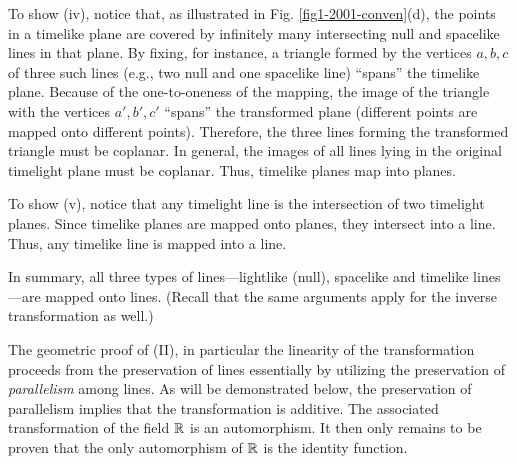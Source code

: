 To show (iv), notice that, as illustrated in Fig. \ref{fig1-2001-conven}(d),
the points in a timelike plane are covered by infinitely many intersecting null and spacelike
lines in that plane.
By fixing, for instance, a triangle formed by the vertices $a,b,c$
of three such lines
(e.g., two null and one spacelike line) ``spans'' the timelike plane.
Because of the one-to-oneness of the mapping,
the image of the triangle with the vertices $a',b',c'$
``spans'' the transformed plane (different points are mapped onto different points).
Therefore, the three lines  forming the transformed
triangle must be coplanar.
In general, the images of all lines lying in the original timelight plane must be coplanar.
Thus, timelike planes map into planes.

To show (v), notice that any timelight line is the intersection of two timelight planes.
Since timelike planes are mapped onto planes, they intersect into a line.
Thus, any timelike line is mapped into a line.

In summary, all three types of lines---lightlike (null), spacelike
and timelike lines---are mapped onto lines.
(Recall that the same arguments apply for the inverse transformation as well.)


The geometric proof of (II), in particular
the linearity of the transformation
proceeds
from the preservation of lines
essentially by utilizing the preservation of {\em parallelism}
among lines.
As will be demonstrated below, the preservation of parallelism
implies that the transformation is additive.
The associated transformation of the field ${\Bbb R}$
is an automorphism.
It then only remains to be proven that the only automorphism of ${\Bbb R}$
is the identity function.


